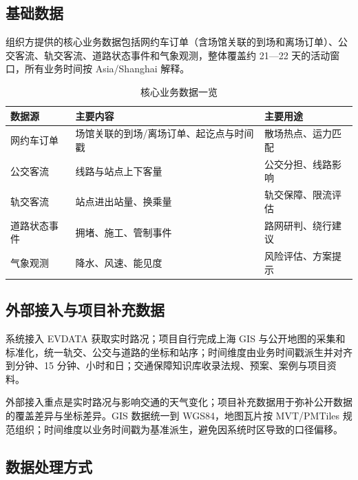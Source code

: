 \documentclass[a4paper,11pt]{article}
\begin{document}
\subsection{基础数据}

组织方提供的核心业务数据包括网约车订单（含场馆关联的到场和离场订单）、公交客流、轨交客流、道路状态事件和气象观测，整体覆盖约 21—22 天的活动窗口，所有业务时间按 Asia/Shanghai 解释。

\begin{table}[ht]
  \centering
  \small
  \begin{tabularx}{0.94\linewidth}{@{}lXl@{}}
    \toprule
    \rowcolor{TableHead}
    \sffamily\bfseries 数据源 & \sffamily\bfseries 主要内容 & \sffamily\bfseries 主要用途 \\
    \midrule
    网约车订单   & 场馆关联的到场/离场订单、起讫点与时间戳 & 散场热点、运力匹配 \\
    公交客流     & 线路与站点上下客量                       & 公交分担、线路影响 \\
    轨交客流     & 站点进出站量、换乘量                     & 轨交保障、限流评估 \\
    道路状态事件 & 拥堵、施工、管制事件                      & 路网研判、绕行建议 \\
    气象观测     & 降水、风速、能见度                        & 风险评估、方案提示 \\
    \bottomrule
  \end{tabularx}
  \caption{核心业务数据一览}
  \label{tab:core-data}
\end{table}

\subsection{外部接入与项目补充数据}

系统接入 EVDATA 获取实时路况；项目自行完成上海 GIS 与公开地图的采集和标准化，统一轨交、公交与道路的坐标和站序；时间维度由业务时间戳派生并对齐到分钟、15 分钟、小时和日；交通保障知识库收录法规、预案、案例与项目资料。

外部接入重点是实时路况与影响交通的天气变化；项目补充数据用于弥补公开数据的覆盖差异与坐标差异。GIS 数据统一到 WGS84，地图瓦片按 MVT/PMTiles 规范组织；时间维度以业务时间戳为基准派生，避免因系统时区导致的口径偏移。

\subsection{数据处理方式}
\end{document}
